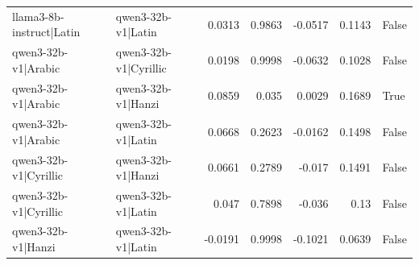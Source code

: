 \begin{table}
\begin{tabular}{l l r r r r l}
llama3-8b-instruct|Latin & qwen3-32b-v1|Latin & 0.0313 & 0.9863 & -0.0517 & 0.1143 & False \\
qwen3-32b-v1|Arabic & qwen3-32b-v1|Cyrillic & 0.0198 & 0.9998 & -0.0632 & 0.1028 & False \\
qwen3-32b-v1|Arabic & qwen3-32b-v1|Hanzi & 0.0859 & 0.035 & 0.0029 & 0.1689 & True \\
qwen3-32b-v1|Arabic & qwen3-32b-v1|Latin & 0.0668 & 0.2623 & -0.0162 & 0.1498 & False \\
qwen3-32b-v1|Cyrillic & qwen3-32b-v1|Hanzi & 0.0661 & 0.2789 & -0.017 & 0.1491 & False \\
qwen3-32b-v1|Cyrillic & qwen3-32b-v1|Latin & 0.047 & 0.7898 & -0.036 & 0.13 & False \\
qwen3-32b-v1|Hanzi & qwen3-32b-v1|Latin & -0.0191 & 0.9998 & -0.1021 & 0.0639 & False \\
\bottomrule
\end{tabular}
\end{table}
